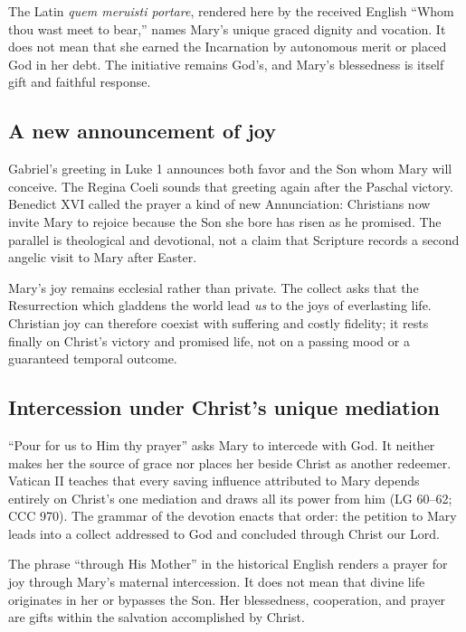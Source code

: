 The Latin \textit{quem meruisti portare}, rendered here by the received English ``Whom thou wast meet to bear,'' names Mary's unique graced dignity and vocation. It does not mean that she earned the Incarnation by autonomous merit or placed God in her debt. The initiative remains God's, and Mary's blessedness is itself gift and faithful response.

\subsection{A new announcement of joy}

Gabriel's greeting in Luke 1 announces both favor and the Son whom Mary will conceive. The Regina Coeli sounds that greeting again after the Paschal victory. Benedict XVI called the prayer a kind of new Annunciation: Christians now invite Mary to rejoice because the Son she bore has risen as he promised. The parallel is theological and devotional, not a claim that Scripture records a second angelic visit to Mary after Easter.

Mary's joy remains ecclesial rather than private. The collect asks that the Resurrection which gladdens the world lead \emph{us} to the joys of everlasting life. Christian joy can therefore coexist with suffering and costly fidelity; it rests finally on Christ's victory and promised life, not on a passing mood or a guaranteed temporal outcome.

\subsection{Intercession under Christ's unique mediation}

``Pour for us to Him thy prayer'' asks Mary to intercede with God. It neither makes her the source of grace nor places her beside Christ as another redeemer. Vatican II teaches that every saving influence attributed to Mary depends entirely on Christ's one mediation and draws all its power from him (LG 60--62; CCC 970). The grammar of the devotion enacts that order: the petition to Mary leads into a collect addressed to God and concluded through Christ our Lord.

The phrase ``through His Mother'' in the historical English renders a prayer for joy through Mary's maternal intercession. It does not mean that divine life originates in her or bypasses the Son. Her blessedness, cooperation, and prayer are gifts within the salvation accomplished by Christ.
